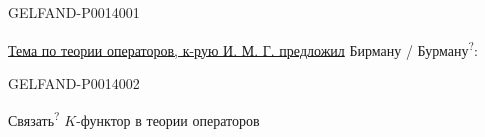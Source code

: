 \begin{GelfandAdjacentEvidence}{GELFAND-P001400}{1}

\uline{Тема по теории операторов, к-рую И. М. Г. предложил}
Бирману / Бурману\textsuperscript{?}:

\end{GelfandAdjacentEvidence}
\begin{GelfandAdjacentEvidence}{GELFAND-P001400}{2}



Связать\textsuperscript{?}
\(K\)-функтор в теории операторов

\end{GelfandAdjacentEvidence}
